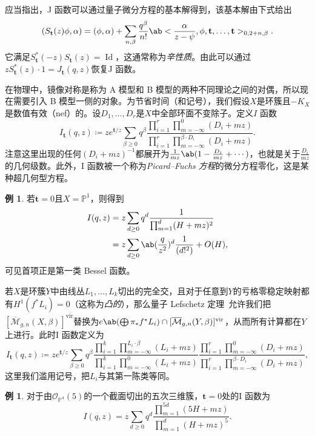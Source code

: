 \documentclass{amsart}
\theoremstyle{definition}
\newtheorem{exm}[thm]{例}
\theoremstyle{remark}
\theoremstyle{plain}
\theoremstyle{definition}
\theoremstyle{remark}
\renewcommand{\P}{\mathbb{P}}
\newcommand{\Mbar}{\overline{\mathcal{M}}}
\newcommand{\mc}[1]{\mathcal{#1}}
\newcommand{\mbf}[1]{\mathbf{#1}}
\newcommand{\mr}[1]{\mathrm{#1}}
\newcommand{\on}[1]{\operatorname{#1}}
\newcommand{\1}{\mathbf{1}}
\newcommand{\2}{\mathbf{2}}
\newcommand{\3}{\mathbf{3}}
\newcommand{\vir}{\mr{vir}}
\begin{document}
应当指出，J 函数可以通过量子微分方程的基本解得到，该基本解由下式给出
\[ ( S_{\mbf{t}}(z) \phi , \alpha) = (\phi, \alpha) + \sum_{n, \beta} \frac{q^{\beta}}{n!} \ab<\frac{\alpha}{z-\psi}, \phi, \mbf{t}, \ldots, \mbf{t}>_{0, 2+n, \beta}. \]
它满足\(S_{\mbf{t}}^*(-z) S_{\mbf{t}}(z) = \on{Id}\)，这通常称为\textit{辛性质}。由此可以通过\(z S_{\mbf{t}}^*(z)\cdot 1 = J_{\mbf{t}}(q, z)\)恢复J 函数。

在物理中，镜像对称是称为 A 模型和 B 模型的两种不同理论之间的对偶，所以现在需要引入 B 模型一侧的对象。为节省时间（和记号），我们假设\(X\)是环簇且\(-K_X\)是数值有效（nef）的。设\(D_1, \ldots, D_r\)是\(X\)中全部环面不变除子。定义\(I\) 函数
\[
    I_{\mbf{t}}(q, z) \coloneqq z e^{\mbf{t}/z} \sum_{\beta \geq 0} q^{\beta} \frac{\prod_{i=1}^r \prod_{m = -\infty}^{0} (D_i + mz)}{\prod_{i=1}^r \prod_{m=-\infty}^{\beta \cdot D_i} (D_i + mz)}.
\]
注意这里出现的任何\((D_i + mz)^{-1}\)都展开为\(\frac{1}{mz} \ab(1 - \frac{D_i}{mz} + \cdots)\)，也就是关于\(\frac{D_i}{mz}\)的几何级数。此外，I 函数被一个称为\textit{Picard--Fuchs 方程}的微分方程零化，这是某种超几何型方程。

\begin{exm}
    若\(\mbf{t} = 0\)且\(X = \P^1\)，则得到
    \begin{align*}
        I(q,z) &= z\sum_{d \geq 0} q^d \frac{1}{\prod_{m=1}^d (H + mz)^2} \\
        &= z\sum_{d \geq 0} \ab(\frac{q}{z^2})^d \frac{1}{(d!^2)} + O(H),
    \end{align*}
    可见首项正是第一类 Bessel 函数。
\end{exm}

若\(X\)是环簇\(Y\)中由线丛\(L_1, \ldots, L_k\)切出的完全交，且对于任意到\(Y\)的亏格零稳定映射都有\(H^1(f^* L_i) = 0\)（这称为\textit{凸的}），那么量子 Lefschetz 定理~\cite{CoatesGivental2007}允许我们把\([\Mbar_{g,n}(X, \beta)]^{\vir}\)替换为\(e\ab(\bigoplus \pi_* f^* L_i) \cap [\Mbar_{g,n}(Y, \beta)]^{\vir}\)，从而所有计算都在\(Y\)上进行。此时I 函数定义为
\[
    I_{\mbf{t}}(q,z) \coloneqq z e^{\mbf{t}/z} \sum_{\beta \geq 0} q^{\beta} \frac{\prod_{i=1}^k \prod_{m=-\infty}^{L_i \cdot \beta} (L_i + mz)}{\prod_{i=1}^k \prod_{m=-\infty}^{0} (L_i + mz)} \frac{\prod_{i=1}^r \prod_{m = -\infty}^{0} (D_i + mz)}{\prod_{i=1}^r \prod_{m=-\infty}^{\beta \cdot D_i} (D_i + mz)},
\]
这里我们滥用记号，把\(L_i\)与其第一陈类等同。

\begin{exm}
    对于由\(\mc{O}_{\P^4}(5)\)的一个截面切出的五次三维簇，\(\mbf{t} = 0\)处的I 函数为
    \[ I(q,z) = z \sum_{d \geq 0} q^d \frac{\prod_{m=1}^{5d}(5H+mz)}{\prod_{m=1}^d (H+mz)^5}. \]
\end{exm}
\end{document}

